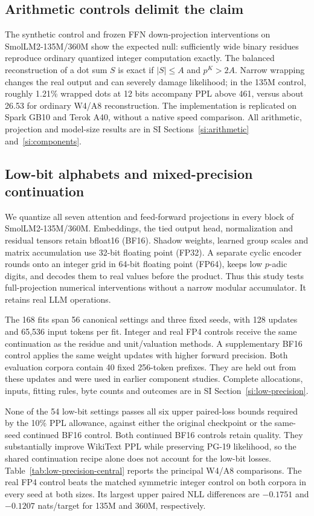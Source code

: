 \documentclass[11pt]{article}
\begin{document}
\subsection{Arithmetic controls delimit the claim}

The synthetic control and frozen FFN down-projection interventions on
SmolLM2-135M/360M show the expected null: sufficiently wide binary residues
reproduce ordinary quantized integer computation exactly. The balanced
reconstruction of a dot sum \(S\) is exact if \(|S|\leq A\) and \(p^K>2A\).
Narrow wrapping changes the real output and can severely damage likelihood;
in the 135M control, roughly 1.21\% wrapped dots at 12 bits accompany PPL
above 461, versus about 26.53 for ordinary W4/A8 reconstruction.
The implementation is replicated on Spark GB10 and Terok A40, without a
native speed comparison. All arithmetic, projection and model-size results
are in SI Sections~\ref{si:arithmetic} and~\ref{si:components}.

\subsection{Low-bit alphabets and mixed-precision continuation}
\label{sec:low-precision-results}

We quantize all seven attention and feed-forward projections in every block
of SmolLM2-135M/360M. Embeddings, the tied output head, normalization and
residual tensors retain bfloat16 (BF16). Shadow weights, learned group scales
and matrix accumulation use 32-bit floating point (FP32). A separate cyclic
encoder rounds onto an integer grid in 64-bit floating point (FP64), keeps
low \(p\)-adic digits, and decodes them to real values before the product.
Thus this study tests full-projection numerical interventions without a
narrow modular accumulator. It retains real LLM operations.

The 168 fits span 56 canonical settings and three fixed seeds, with 128
updates and 65,536 input tokens per fit. Integer and real FP4 controls receive
the same continuation as the residue and unit/valuation methods. A
supplementary BF16 control applies the same weight updates with higher
forward precision. Both evaluation corpora contain 40 fixed 256-token
prefixes. They are held out from these updates and were used in earlier
component studies. Complete allocations, inputs, fitting rules, byte counts
and outcomes are in SI Section~\ref{si:low-precision}.

None of the 54 low-bit settings passes all six upper paired-loss bounds
required by the 10\% PPL allowance, against either the original checkpoint
or the same-seed continued BF16 control. Both continued BF16 controls retain
quality. They substantially improve WikiText PPL while preserving PG-19
likelihood, so the shared continuation recipe alone does not account for
the low-bit losses. Table~\ref{tab:low-precision-central} reports the
principal W4/A8 comparisons. The real FP4 control beats the matched symmetric
integer control on both corpora in every seed at both sizes. Its largest
upper paired NLL differences are \(-0.1751\) and \(-0.1207\) nats/target
for 135M and 360M, respectively.
\end{document}
